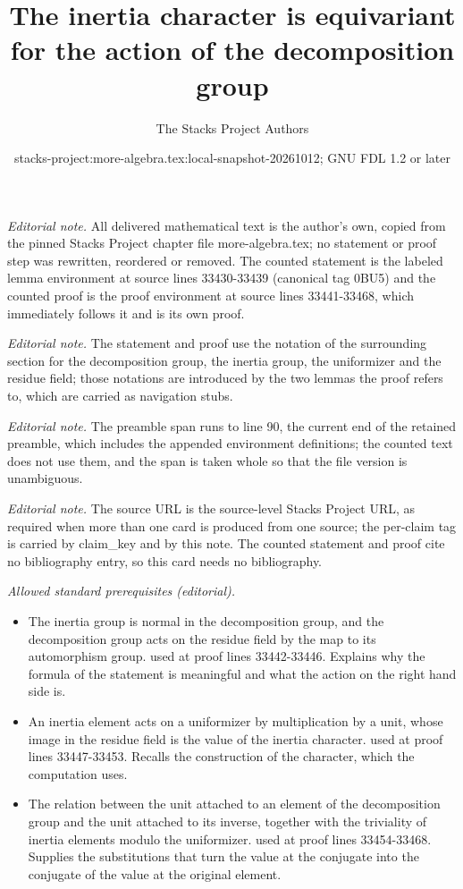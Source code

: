 \documentclass[10pt,a4paper]{amsart}
\title{The inertia character is equivariant for the action of the decomposition group}
\author{The Stacks Project Authors}
\date{stacks-project:more-algebra.tex:local-snapshot-20261012; GNU FDL 1.2 or later}
\theoremstyle{plain}
\theoremstyle{definition}
\theoremstyle{remark}
\numberwithin{equation}{subsection}
\begin{document}
\maketitle
\setcounter{subsection}{1}
\noindent\textit{Editorial note.} All delivered mathematical text is the author's own, copied from the pinned Stacks Project chapter file more-algebra.tex; no statement or proof step was rewritten, reordered or removed. The counted statement is the labeled lemma environment at source lines 33430-33439 (canonical tag 0BU5) and the counted proof is the proof environment at source lines 33441-33468, which immediately follows it and is its own proof.\par\medskip
\noindent\textit{Editorial note.} The statement and proof use the notation of the surrounding section for the decomposition group, the inertia group, the uniformizer and the residue field; those notations are introduced by the two lemmas the proof refers to, which are carried as navigation stubs.\par\medskip
\noindent\textit{Editorial note.} The preamble span runs to line 90, the current end of the retained preamble, which includes the appended environment definitions; the counted text does not use them, and the span is taken whole so that the file version is unambiguous.\par\medskip
\noindent\textit{Editorial note.} The source URL is the source-level Stacks Project URL, as required when more than one card is produced from one source; the per-claim tag is carried by claim\_key and by this note. The counted statement and proof cite no bibliography entry, so this card needs no bibliography.\par\medskip
\noindent\textit{Allowed standard prerequisites (editorial).}\begin{itemize}
\item The inertia group is normal in the decomposition group, and the decomposition group acts on the residue field by the map to its automorphism group. used at proof lines 33442-33446. Explains why the formula of the statement is meaningful and what the action on the right hand side is.
\item An inertia element acts on a uniformizer by multiplication by a unit, whose image in the residue field is the value of the inertia character. used at proof lines 33447-33453. Recalls the construction of the character, which the computation uses.
\item The relation between the unit attached to an element of the decomposition group and the unit attached to its inverse, together with the triviality of inertia elements modulo the uniformizer. used at proof lines 33454-33468. Supplies the substitutions that turn the value at the conjugate into the conjugate of the value at the original element.
\end{itemize}\medskip
\end{document}
